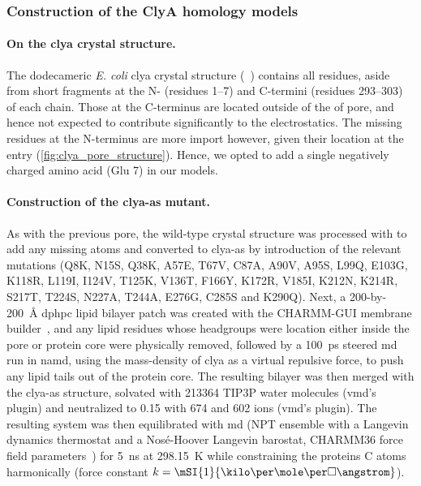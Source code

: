 \subsubsection{Construction of the ClyA homology models}

\paragraph{On the \gls{clya} crystal structure.}
%
The dodecameric \textit{E. coli} \gls{clya} crystal structure (~\cite{Mueller-2009}) contains all
residues, aside from short fragments at the N- (residues \numrange{1}{7}) and C-termini (residues
\numrange{293}{303}) of each chain. Those at the C-terminus are located outside of the \lumen{} of pore, and
hence not expected to contribute significantly to the electrostatics. The missing residues at the N-terminus
are more import however, given their location at the \transi{} entry (\cref{fig:clya_pore_structure}). Hence,
we opted to add a single negatively charged amino acid  (Glu 7) in our models.

\paragraph{Construction of the \gls{clya-as} mutant.}
%
As with the previous pore, the wild-type crystal structure was processed with  to add any missing
atoms and converted to \gls{clya-as} by introduction of the relevant mutations (Q8K, N15S, Q38K, A57E, T67V,
C87A, A90V, A95S, L99Q, E103G, K118R, L119I, I124V, T125K, V136T, F166Y, K172R, V185I, K212N, K214R, S217T,
T224S, N227A, T244A, E276G, C285S and K290Q). Next, a 200-by-\SI{200}{\angstrom} \gls{dphpc} lipid bilayer
patch was created with the CHARMM-GUI membrane builder~\cite{Jo-2008,Lee-2015}, and any lipid residues whose
headgroups were location either inside the pore \lumen{} or protein core were physically removed, followed by
a \SI{100}{\ps} steered \gls{md} run in \gls{namd}, using the mass-density of \gls{clya} as a virtual
repulsive force, to push any lipid tails out of the protein core. The resulting bilayer was then merged with
the \gls{clya-as} structure, solvated with 213364 {TIP3P} water molecules (\gls{vmd}'s  plugin)
and neutralized to \SI{0.15}{\Molar} with 674  and 602  ions (\gls{vmd}'s 
plugin). The resulting system was then equilibrated with \gls{md} (NPT ensemble with a Langevin dynamics
thermostat and a Nos\'{e}-Hoover Langevin barostat, CHARMM36 force field parameters~\cite{Best-2012}) for
\SI{5}{\ns} at \SI{298.15}{\kelvin} while constraining the proteins C\ta{} atoms harmonically (force constant
$k = \mSI{1}{\kilo\cal\per\mole\per\square\angstrom}$).

